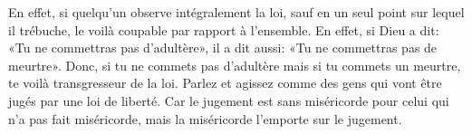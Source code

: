 En effet, si quelqu’un observe intégralement la loi,
	sauf en un seul point sur lequel il trébuche,
	le voilà coupable par rapport à l’ensemble.
En effet, si Dieu a dit: «Tu ne commettras pas d’adultère»,
	il a dit aussi: «Tu ne commettras pas de meurtre».
Donc, si tu ne commets pas d’adultère mais si tu commets un meurtre,
	te voilà transgresseur de la loi.
Parlez et agissez comme des gens qui vont être jugés par une loi de liberté.
Car le jugement est sans miséricorde pour celui qui n’a pas fait miséricorde,
	mais la miséricorde l’emporte sur le jugement.

